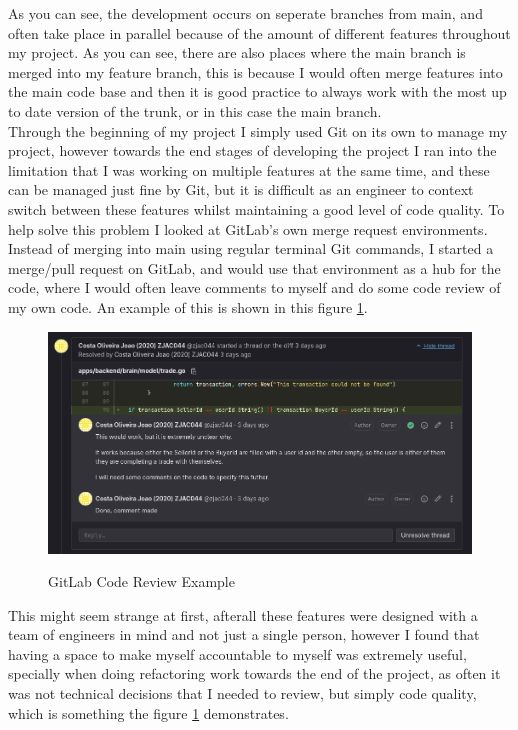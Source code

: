\documentclass[titlepage]{article}
\begin{document}
As you can see, the development occurs on seperate branches from main, and often take place in parallel because of the amount of different features throughout my project. As you can see, there are also places where the main branch is merged into my feature branch, this is because I would often merge features into the main code base and then it is good practice to always work with the most up to date version of the trunk, or in this case the main branch. \\

Through the beginning of my project I simply used Git on its own to manage my project, however towards the end stages of developing the project I ran into the limitation that I was working on multiple features at the same time, and these can be managed just fine by Git, but it is difficult as an engineer to context switch between these features whilst maintaining a good level of code quality. To help solve this problem I looked at GitLab's own merge request environments. Instead of merging into main using regular terminal Git commands, I started a merge/pull request on GitLab, and would use that environment as a hub for the code, where I would often leave comments to myself and do some code review of my own code. An example of this is shown in this figure \ref{gitlab}. \\

\begin{figure}[h!]
  \caption{GitLab Code Review Example}
\hspace*{-3cm}
\includegraphics[width=1.5\textwidth]{../Diagrams/GitLab.png}
\label{gitlab}
\end{figure}

This might seem strange at first, afterall these features were designed with a team of engineers in mind and not just a single person, however I found that having a space to make myself accountable to myself was extremely useful, specially when doing refactoring work towards the end of the project, as often it was not technical decisions that I needed to review, but simply code quality, which is something the figure \ref{gitlab} demonstrates. \\
\end{document}
